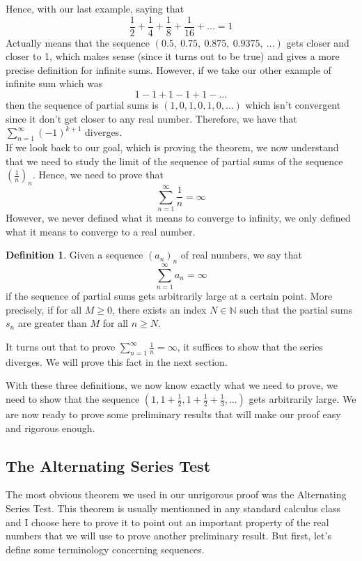 \documentclass[10pt]{article}
\newcommand{\N}{\mathbb{N}}
\theoremstyle{definition}
\newtheorem*{definition}{Definition}
\begin{document}
Hence, with our last example, saying that
$$\frac{1}{2} + \frac{1}{4} + \frac{1}{8} + \frac{1}{16} + ... = 1$$
Actually means that the sequence $(0.5, \ 0.75, \ 0.875, \ 0.9375, \ ...)$ gets closer and closer to 1, which makes sense (since it turns out to be true) and gives a more precise definition for infinite sums. However, if we take our other example of infinite sum which was
$$1 - 1 + 1 - 1 + 1 - ...$$
then the sequence of partial sums is $(1, 0, 1, 0, 1, 0, ...)$ which isn't convergent since it don't get closer to any real number. Therefore, we have that $\sum_{n=1}^{\infty}(-1)^{k+1}$ diverges. \\

If we look back to our goal, which is proving the theorem, we now understand that we need to study the limit of the sequence of partial sums of the sequence $(\frac{1}{n})_n$. Hence, we need to prove that
$$\sum_{n=1}^{\infty}\frac{1}{n} = \infty$$
However, we never defined what it means to converge to infinity, we only defined what it means to converge to a real number.

\begin{definition}
    Given a sequence $(a_n)_n$ of real numbers, we say that
    $$\sum_{n=1}^{\infty}a_n = \infty$$
    if the sequence of partial sums gets arbitrarily large at a certain point. More precisely, if for all $M \geq 0$, there exists an index $N \in \N$ such that the partial sums $s_n$ are greater than $M$ for all $n \geq N$.
\end{definition}

It turns out that to prove $\sum_{n=1}^{\infty}\frac{1}{n} = \infty$, it suffices to show that the series diverges. We will prove this fact in the next section.

With these three definitions, we now know exactly what we need to prove, we need to show that the sequence $(1, 1 + \frac{1}{2}, 1 + \frac{1}{2} + \frac{1}{3}, ...)$ gets arbitrarily large. We are now ready to prove some preliminary results that will make our proof easy and rigorous enough.

\subsection{The Alternating Series Test}

The most obvious theorem we used in our unrigorous proof was the Alternating Series Test. This theorem is usually mentionned in any standard calculus class and I choose here to prove it to point out an important property of the real numbers that we will use to prove another preliminary result. But first, let's define some terminology concerning sequences.
\end{document}
